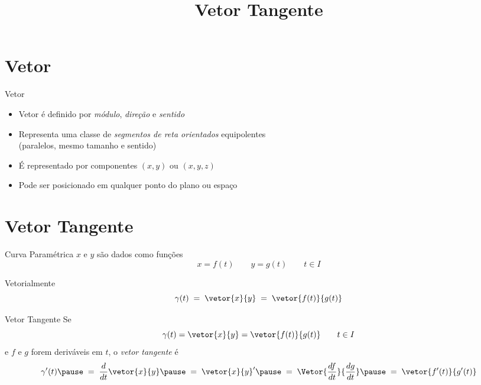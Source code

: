 \documentclass[fleqn,utf8,aspectratio=169,12pt]{beamer}
\title{Vetor Tangente}
\begin{document}
\addtitle

\section{Vetor}

\begin{frame}{Vetor}
\begin{itemize}[<+->]
  \setlength\itemsep{1em}
  \item Vetor é definido por \emph{módulo}, \emph{direção} e \emph{sentido}
  \item Representa uma classe de \emph{segmentos de reta orientados} equipolentes\\
        (paralelos, mesmo tamanho e sentido)
  \item É representado por componentes \((x,y)\) ou \((x,y,z)\)
  \item Pode ser posicionado em qualquer ponto do plano ou espaço
\end{itemize}
\end{frame}



\section{Vetor Tangente}

\begin{frame}{Curva Paramétrica}
  $x$ e $y$ são dados como funções
  \[
    x = f(t)     \qquad
    y = g(t)     \qquad
    t \in I
  \]

  \pause
  Vetorialmente
  \[
    \gamma(t)
    \;=\; \vetor{x}{y}
    \;=\; \vetor{f(t)}{g(t)}
  \]
\end{frame}


\begin{frame}{Vetor Tangente}
  Se
  \[
    \gamma(t)
    = \vetor{x}{y}
    = \vetor{f(t)}{g(t)}
    \qquad
    t \in I
  \]
  \pause
  e $f$ e $g$ forem deriváveis em $t$,
  \pause
  o \emph{vetor tangente} é
  \pause
  \[
    \gamma'(t)
    \pause
    \;=\; \frac{d}{dt} \vetor{x}{y}
    \pause
    \;=\; \vetor{x}{y}'
    \pause
    \;=\; \Vetor{\dfrac{df}{dt}}{\dfrac{dg}{dt}}
    \pause
    \;=\; \vetor{f'(t)}{g'(t)}
  \]
\end{frame}
\end{document}

